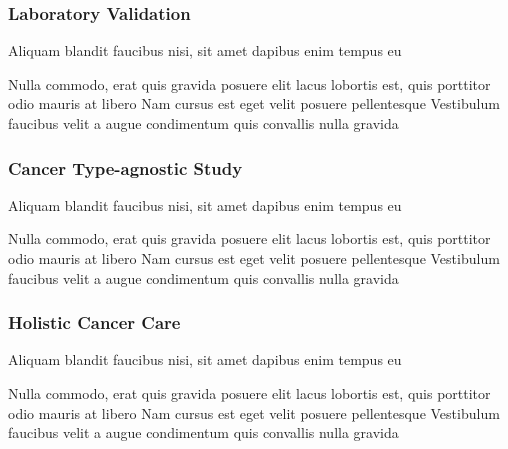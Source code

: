 \documentclass[
paper=landscape,
paper=160mm:90mm, %
fontsize=11pt, %
pagesize, %
parskip=half-, %
]{scrartcl} %
\theoremstyle{mythmstyle} %
\begin{document}
\clearpage

\subsubsection{Laboratory Validation}

\begin{outline}

\1 Aliquam blandit faucibus nisi, sit amet dapibus enim tempus eu

\2 Nulla commodo, erat quis gravida posuere
\1 elit lacus lobortis est, quis porttitor odio mauris at libero
\1 Nam cursus est eget velit posuere pellentesque
\1 Vestibulum faucibus velit a augue condimentum quis convallis nulla gravida

\end{outline}


\clearpage

\subsubsection{Cancer Type-agnostic Study}

\begin{outline}

\1 Aliquam blandit faucibus nisi, sit amet dapibus enim tempus eu

\2 Nulla commodo, erat quis gravida posuere
\1 elit lacus lobortis est, quis porttitor odio mauris at libero
\1 Nam cursus est eget velit posuere pellentesque
\1 Vestibulum faucibus velit a augue condimentum quis convallis nulla gravida

\end{outline}


\clearpage

\subsubsection{Holistic Cancer Care} 


\begin{outline}

\1 Aliquam blandit faucibus nisi, sit amet dapibus enim tempus eu

\2 Nulla commodo, erat quis gravida posuere
\1 elit lacus lobortis est, quis porttitor odio mauris at libero
\1 Nam cursus est eget velit posuere pellentesque
\1 Vestibulum faucibus velit a augue condimentum quis convallis nulla gravida

\end{outline}
\end{document}
